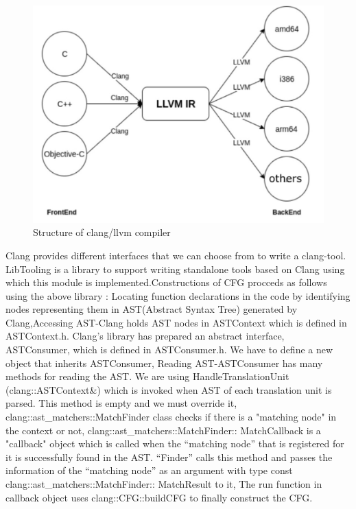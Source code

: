\begin{figure}[h]
\centering
\includegraphics[width=1\textwidth]{3/llvm.jpg}
\caption{Structure of clang/llvm compiler}
\label{fig:llvm}
\end{figure}
Clang provides different interfaces that we can choose from to write a clang-tool. LibTooling is a library to support writing standalone tools based on Clang using which this module is implemented.Constructions of CFG procceds as follows using the above library :  Locating function declarations in the code by identifying nodes representing them in AST(Abstract Syntax Tree) generated by Clang,Accessing AST-Clang holds AST nodes in ASTContext which is defined in ASTContext.h. Clang’s library has prepared an abstract interface, ASTConsumer, which is defined in ASTConsumer.h. We have to define a new object that inherits ASTConsumer,  Reading AST-ASTConsumer has many methods for reading the AST. We are using HandleTranslationUnit (clang::ASTContext&) which is invoked when AST of each translation unit is parsed. This method is empty and we must override it, clang::ast\_matchers::MatchFinder class checks if there is a "matching node" in the context or not, clang::ast\_matchers::MatchFinder:: MatchCallback is a "callback" object which is called when the “matching node” that is registered for it is successfully found in the AST. “Finder” calls this method and passes the information of the “matching node” as an argument with type const \hspace{20} clang::ast\_matchers::MatchFinder::
MatchResult to it, The run function in callback object uses clang::CFG::buildCFG to finally construct the CFG.


